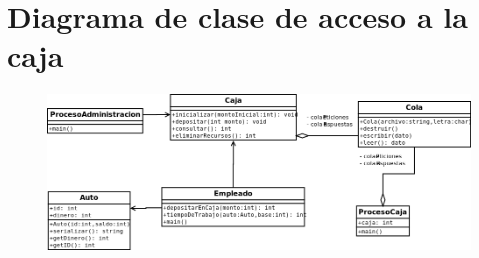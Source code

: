\documentclass[12pt,a4paper,spanish]{article}
\begin{document}
	\newpage
	\section{Diagrama de clase de acceso a la caja}

	\begin{figure}[h]
	\includegraphics[angle=90,scale=0.56]{AccesoCaja2.png}
	\centering
	\end{figure}
\end{document}
